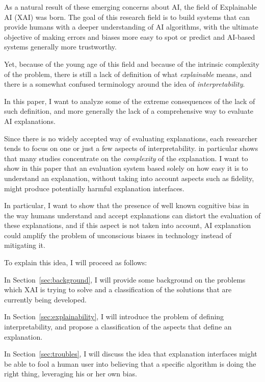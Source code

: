 \documentclass[conference]{IEEEtran}
\begin{document}
As a natural result of these emerging concerns about AI, the field of
Explainable AI (XAI) was born. The goal of this research field is to build
systems that can provide humans with a deeper understanding of AI algorithms,
with the ultimate objective of making errors and biases more easy to spot or
predict and AI-based systems generally more trustworthy.

Yet, because of the young age of this field and because of the intrinsic
complexity of the problem, there is still a lack of definition of what
\textit{explainable} means, and there is a somewhat confused terminology around
the idea of \textit{interpretability}.

In this paper, I want to analyze some of the extreme consequences of the lack of
such definition, and more generally the lack of a comprehensive way to evaluate
AI explanations.

Since there is no widely accepted way of evaluating explanations, each
researcher tends to focus on one or just a few aspects of interpretability.
\citet{Giannotti} in particular shows that many studies concentrate on the
\textit{complexity} of the explanation. I want to show in this paper that an
evaluation system based solely on how easy it is to understand an explanation,
without taking into account aspects such as fidelity, might produce potentially
harmful explanation interfaces.

In particular, I want to show that the presence of well known cognitive bias in
the way humans understand and accept explanations can distort the evaluation of
these explanations, and if this aspect is not taken into account, AI explanation
could amplify the problem of unconscious biases in technology instead of
mitigating it.

To explain this idea, I will proceed as follows:

In Section~\ref{sec:background}, I will provide some background on the problems
which XAI is trying to solve and a classification of the solutions that are
currently being developed.

In Section~\ref{sec:explainability}, I will introduce the problem of defining
interpretability, and propose a classification of the aspects that define an
explanation.

In Section~\ref{sec:troubles}, I will discuss the idea that explanation
interfaces might be able to fool a human user into believing that a specific
algorithm is doing the right thing, leveraging his or her own bias.
\end{document}
